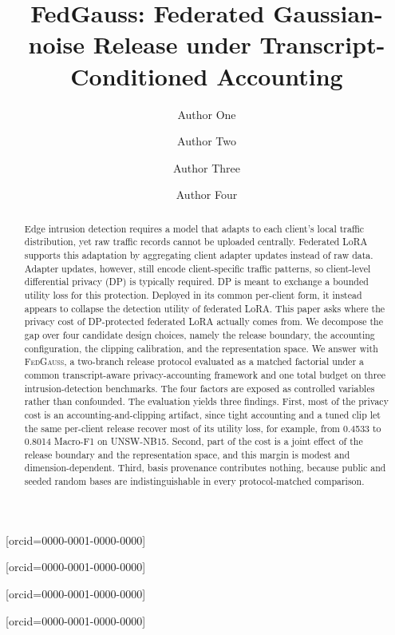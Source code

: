 \documentclass[a4paper,fleqn]{cas-dc}
\newcommand{\method}{\textsc{FedGauss}}
\begin{document}
\shorttitle{}
\title[mode=title]{FedGauss: Federated Gaussian-noise Release under Transcript-Conditioned Accounting}
\tnotemark[1]
\author[1]{Author One}[orcid=0000-0001-0000-0000]
\author[2]{Author Two}[orcid=0000-0001-0000-0000]
\cormark[1]
\author[1,3]{Author Three}[orcid=0000-0001-0000-0000]
\author[1,3]{Author Four}[orcid=0000-0001-0000-0000]
\begin{abstract}
Edge intrusion detection requires a model that adapts to each client's local traffic distribution, yet raw traffic records cannot be uploaded centrally. Federated LoRA supports this adaptation by aggregating client adapter updates instead of raw data. Adapter updates, however, still encode client-specific traffic patterns, so client-level differential privacy (DP) is typically required. DP is meant to exchange a bounded utility loss for this protection. Deployed in its common per-client form, it instead appears to collapse the detection utility of federated LoRA. This paper asks where the privacy cost of DP-protected federated LoRA actually comes from. We decompose the gap over four candidate design choices, namely the release boundary, the accounting configuration, the clipping calibration, and the representation space. We answer with \method, a two-branch release protocol evaluated as a matched factorial under a common transcript-aware privacy-accounting framework and one total budget on three intrusion-detection benchmarks. The four factors are exposed as controlled variables rather than confounded. The evaluation yields three findings. First, most of the privacy cost is an accounting-and-clipping artifact, since tight accounting and a tuned clip let the same per-client release recover most of its utility loss, for example, from 0.4533 to 0.8014 Macro-F1 on UNSW-NB15. Second, part of the cost is a joint effect of the release boundary and the representation space, and this margin is modest and dimension-dependent. Third, basis provenance contributes nothing, because public and seeded random bases are indistinguishable in every protocol-matched comparison.
\end{abstract}
\end{document}
